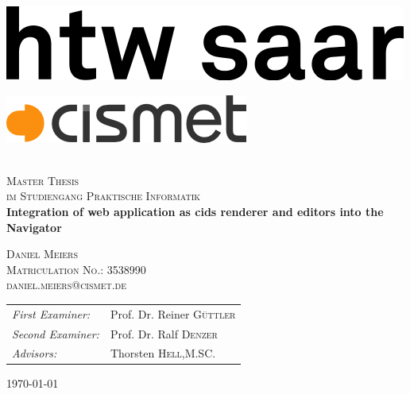 \begin{titlepage}
\begin{center}

\begin{minipage}[t]{0.4\textwidth}
	\begin{flushleft}
	\includegraphics[width=\textwidth]{preamble/img/logo_htw_saar}
	\end{flushleft}
\end{minipage}
\hfill
\begin{minipage}[t]{0.4\textwidth}
	\begin{flushright}
	\includegraphics[width=\textwidth]{preamble/img/logo_cismet_grey}
	\end{flushright}
\end{minipage}



~\\[1cm]

\textsc{\LARGE Master Thesis}\\
\textsc{\large im Studiengang Praktische Informatik}\\[1.5cm]
\hspace{0.4cm}
{ \huge \bfseries Integration of web application as cids renderer and editors into the Navigator\\[0.4cm] }

\hspace{1.5cm}

\textsc{\large Daniel Meiers}\\[0.2cm]
\textsc{\large Matriculation No.: 3538990}\\[0.2cm]
\textsc{\large daniel.meiers@cismet.de}\\[4cm]

\begin{tabular}[0.8\textwidth]{l l}
\emph{First Examiner:} & Prof. Dr. Reiner \textsc{Güttler}  \\
\emph{Second Examiner:} &  Prof. Dr. Ralf \textsc{Denzer}\\
\emph{Advisors:} & Thorsten \textsc{Hell},M.SC.
\end{tabular}


\vfill

{\large \today}

\end{center}
\end{titlepage}